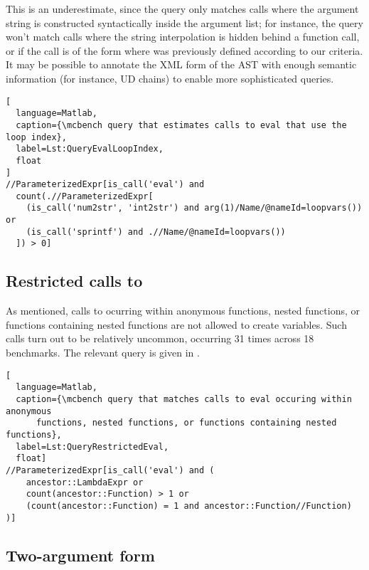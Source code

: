 This is an underestimate, since the query only matches calls where the argument
string is constructed syntactically inside the argument list; for instance, the
query won't match calls where the string interpolation is hidden behind a
function call, or if the call is of the form  where  was
previously defined according to our criteria. It may be possible to annotate
the XML form of the AST with enough semantic information (for instance, UD
chains) to enable more sophisticated queries.


\begin{lstlisting}[
  language=Matlab,
  caption={\mcbench query that estimates calls to eval that use the loop index},
  label=Lst:QueryEvalLoopIndex,
  float
]
//ParameterizedExpr[is_call('eval') and
  count(.//ParameterizedExpr[
    (is_call('num2str', 'int2str') and arg(1)/Name/@nameId=loopvars()) or
    (is_call('sprintf') and .//Name/@nameId=loopvars())
  ]) > 0]
\end{lstlisting}

\subsection{Restricted calls to }

As mentioned, calls to  ocurring within anonymous functions, nested
functions, or functions containing nested functions are not allowed to create
variables. Such calls turn out to be relatively uncommon, occurring 31 times
across 18 benchmarks. The relevant query is given in
.

\begin{lstlisting}[
  language=Matlab,
  caption={\mcbench query that matches calls to eval occuring within anonymous
      functions, nested functions, or functions containing nested functions},
  label=Lst:QueryRestrictedEval,
  float]
//ParameterizedExpr[is_call('eval') and (
    ancestor::LambdaExpr or
    count(ancestor::Function) > 1 or
    (count(ancestor::Function) = 1 and ancestor::Function//Function)
)]
\end{lstlisting}

\subsection{Two-argument form}

